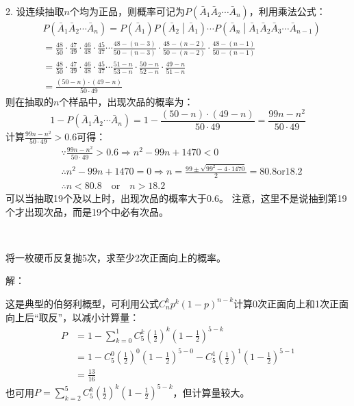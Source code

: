 2. 设连续抽取$n$个均为正品，则概率可记为$P\left( \bar{A}_1\bar{A}_2\cdots \bar{A}_n \right) $，利用乘法公式：
\begin{align*}
&P\left( \bar{A}_1\bar{A}_2\cdots \bar{A}_n \right) =P\left( \bar{A}_1 \right) P\left( \bar{A}_2 \middle| \bar{A}_1 \right) \cdots P\left( \bar{A}_n \middle| \bar{A}_1\bar{A}_2\bar{A}_3\cdots \bar{A}_{n-1} \right) \\
&=\frac{48}{50}\cdot \frac{47}{49}\cdot \frac{46}{48}\cdot \frac{45}{47}\cdots \frac{48-\left( n-3 \right)}{50-\left( n-3 \right)}\cdot \frac{48-\left( n-2 \right)}{50-\left( n-2 \right)}\cdot \frac{48-\left( n-1 \right)}{50-\left( n-1 \right)} \\
&=\frac{48}{50}\cdot \frac{47}{49}\cdot \frac{46}{48}\cdot \frac{45}{47}\cdots \frac{51-n}{53-n}\cdot \frac{50-n}{52-n}\cdot \frac{49-n}{51-n} \\
&=\frac{\left( 50-n \right) \cdot \left( 49-n \right)}{50\cdot 49}
\end{align*}
则在抽取的$n$个样品中，出现次品的概率为：
\[
1-P\left( \bar{A}_1\bar{A}_2\cdots \bar{A}_n \right) =1-\frac{\left( 50-n \right) \cdot \left( 49-n \right)}{50\cdot 49}=\frac{99n-n^2}{50\cdot 49}
\]
计算$\frac{99n-n^2}{50\cdot 49}>0.6$可得：
\begin{align*}
&\because \frac{99n-n^2}{50\cdot 49}>0.6 \Rightarrow n^2-99n+1470<0 \\
&\therefore n^2-99n+1470=0 \Rightarrow n=\frac{99\pm \sqrt{99^2-4\cdot 1470}}{2}=80.8 \mathrm{or} 18.2 \\
&\therefore n<80.8 \quad \mathrm{or} \quad n>18.2
\end{align*}
可以当抽取19个及以上时，出现次品的概率大于0.6。
注意，这里不是说抽到第19个才出现次品，而是19个中必有次品。

~

\begin{example}
将一枚硬币反复抛5次，求至少2次正面向上的概率。
\end{example}

解：

这是典型的伯努利概型，可利用公式$C_{n}^{k}p^k\left( 1-p \right) ^{n-k}$计算0次正面向上和1次正面向上后“取反”，以减小计算量：
\begin{align*}
P&=1-\sum_{k=0}^1{C_{5}^{k}\left( \frac{1}{2} \right) ^k\left( 1-\frac{1}{2} \right) ^{5-k}} \\
&=1-C_{5}^{0}\left( \frac{1}{2} \right) ^0\left( 1-\frac{1}{2} \right) ^{5-0}-C_{5}^{1}\left( \frac{1}{2} \right) ^1\left( 1-\frac{1}{2} \right) ^{5-1} \\
&=\frac{13}{16}
\end{align*}
也可用$P=\sum_{k=2}^5{C_{5}^{k}\left( \frac{1}{2} \right) ^k\left( 1-\frac{1}{2} \right) ^{5-k}}$，但计算量较大。

